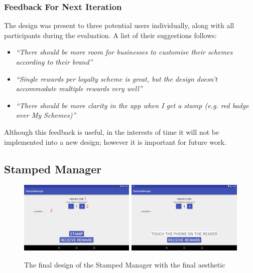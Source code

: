 \subsubsection{Feedback For Next Iteration}
The design was present to three potential users individually, along with all participants during the evaluation. A list of their suggestions follows:
\begin{itemize}
  \item \textit{``There should be more room for businesses to customise their schemes according to their brand''}
  \item \textit{``Single rewards per loyalty scheme is great, but the design doesn't accommodate multiple rewards very well''}
  \item \textit{``There should be more clarity in the app when I get a stamp (e.g. red badge over My Schemes)''}
\end{itemize}

Although this feedback is useful, in the interests of time it will not be implemented into a new design; however it is important for future work.

\subsection{Stamped Manager}
\begin{figure}[H]
 \centering
  \includegraphics[width=0.494\textwidth]{img/readerfinalmock2.png}
   \includegraphics[width=0.494\textwidth]{img/readerfinalmock1.png}
     \caption{The final design of the Stamped Manager with the final aesthetic}
     \label{fig:wireframemr2}
\end{figure}

